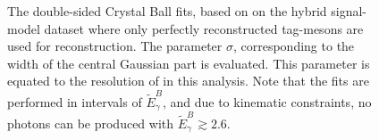 \begin{figure}[htbp!]
{    }

    \caption{\label{fig:issignal_resolution_fits} The double-sided Crystal Ball fits, based on  
    on the hybrid signal-model dataset where only perfectly reconstructed tag-\B mesons are used for \EB reconstruction.
    The parameter $\sigma$, corresponding to the width of the central Gaussian part is evaluated.
    This parameter is equated to the resolution of \EB in this analysis.
    Note that the fits are performed in intervals of $\tilde{E}_{\gamma}^B$, and due to kinematic constraints,
    no \BtoXsgamma photons can be produced with $\tilde{E}_{\gamma}^B\gtrsim 2.6$.
    }
\end{figure}

